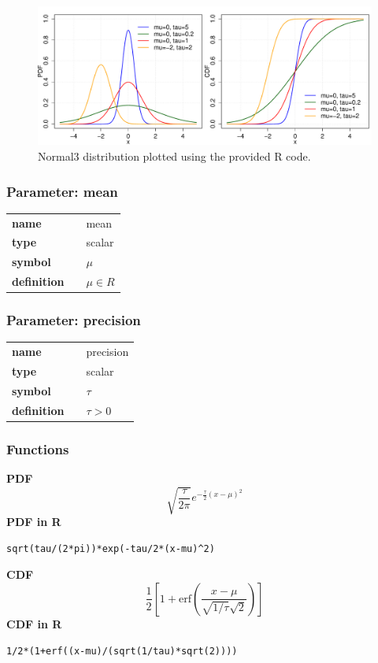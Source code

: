 \begin{figure}[ht!]
\centering
  \includegraphics[width=140mm]{pics/Normal3.pdf}
 \caption{Normal3 distribution plotted using the provided R code.}
 \label{fig:Normal3}
\end{figure}

\subsubsection*{Parameter: mean}

\noindent\begin{tabular}{p{2cm}cl}
\textbf{name} & & mean \\
\textbf{type} & & scalar \\
\textbf{symbol} & & $\mu$  \\
\textbf{definition} & & $\mu \in R$
\end{tabular}
\subsubsection*{Parameter: precision}

\noindent\begin{tabular}{p{2cm}cl}
\textbf{name} & & precision \\
\textbf{type} & & scalar \\
\textbf{symbol} & & $\tau$  \\
\textbf{definition} & & $\tau>0$
\end{tabular}
\subsubsection*{Functions}

\smallskip \noindent \hspace{.2cm} \textbf{PDF} 
\begin{equation*}\sqrt{\frac{\tau}{2 \pi}} e^{-\frac{\tau}{2}(x-\mu)^2}\end{equation*}
\smallskip \noindent \hspace{.2cm} \textbf{PDF in R}  
\begin{verbatim}sqrt(tau/(2*pi))*exp(-tau/2*(x-mu)^2)\end{verbatim}
\smallskip \noindent \hspace{.2cm} \textbf{CDF} 
\begin{equation*}\frac12\left[1 + \text{erf}\left( \frac{x-\mu}{\sqrt{1/\tau}\sqrt{2}}\right)\right]\end{equation*}
\smallskip \noindent \hspace{.2cm} \textbf{CDF in R} 
\begin{verbatim}1/2*(1+erf((x-mu)/(sqrt(1/tau)*sqrt(2)))) \end{verbatim}
\smallskip
